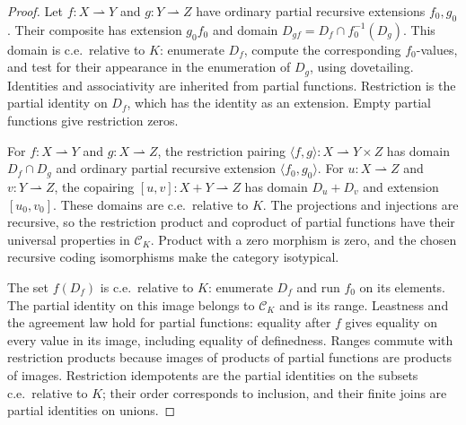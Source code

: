 \begin{proof}
Let $f:X\rightharpoonup Y$ and $g:Y\rightharpoonup Z$ have
ordinary partial recursive extensions $f_0,g_0$. Their composite has
extension $g_0f_0$ and domain $D_{gf}=D_f\cap f_0^{-1}(D_g)$.
This domain is c.e.\ relative to $K$: enumerate $D_f$, compute the
corresponding $f_0$-values, and test for their appearance in the
enumeration of $D_g$, using dovetailing. Identities and associativity
are inherited from partial functions. Restriction is the partial
identity on $D_f$, which has the identity as an extension.
Empty partial functions give restriction zeros.

For $f:X\rightharpoonup Y$ and $g:X\rightharpoonup Z$, the
restriction pairing $\langle f,g\rangle:X\rightharpoonup Y\times Z$
has domain $D_f\cap D_g$ and ordinary partial recursive extension
$\langle f_0,g_0\rangle$. For $u:X\rightharpoonup Z$ and
$v:Y\rightharpoonup Z$, the copairing $[u,v]:X+Y\rightharpoonup Z$
has domain $D_u+D_v$ and extension $[u_0,v_0]$. These domains are
c.e.\ relative to $K$. The projections and injections are recursive,
so the restriction product and coproduct of partial functions have
their universal properties in $\mathcal C_K$. Product with a zero morphism is zero, and the chosen
recursive coding isomorphisms make the category isotypical.

The set $f(D_f)$ is c.e.\ relative to $K$: enumerate $D_f$ and run
$f_0$ on its elements. The partial identity on this image belongs to
$\mathcal C_K$ and is its range. Leastness and the agreement law
hold for partial functions: equality after $f$ gives equality on
every value in its image, including equality of definedness.
Ranges commute with restriction products because images of products
of partial functions are products of images. Restriction idempotents
are the partial identities on the subsets c.e.\ relative to $K$;
their order corresponds to inclusion, and their finite joins are
partial identities on unions.


\end{proof}

